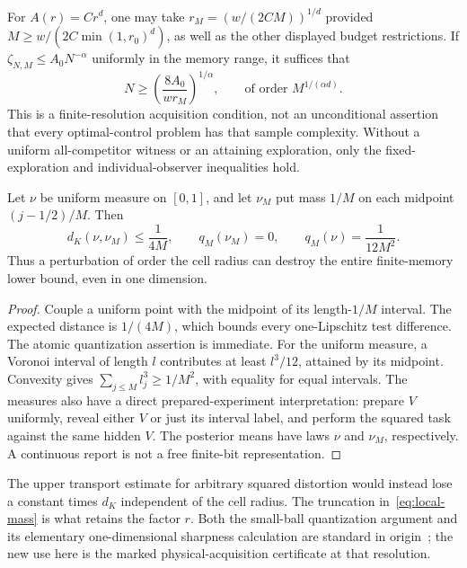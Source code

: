 For $A(r)=Cr^d$, one may take $r_M=(w/(2CM))^{1/d}$ provided $M\ge w/(2C\min(1,r_0)^d)$, as well as the other displayed budget restrictions. If $\zeta_{N,M}\le A_0N^{-\alpha}$ uniformly in the memory range, it suffices that
\[
 N\ge \left(\frac{8A_0}{wr_M}\right)^{1/\alpha},
 \qquad\text{of order }M^{1/(\alpha d)}.
\]
This is a finite-resolution acquisition condition, not an unconditional assertion that every optimal-control problem has that sample complexity. Without a uniform all-competitor witness or an attaining exploration, only the fixed-exploration and individual-observer inequalities hold.

\begin{proposition}\label{prop:resolution-sharp}
Let $\nu$ be uniform measure on $[0,1]$, and let $\nu_M$ put mass $1/M$ on each midpoint $(j-1/2)/M$. Then
\[
 d_K(\nu,\nu_M)\le\frac1{4M},\qquad
 q_M(\nu_M)=0,\qquad q_M(\nu)=\frac1{12M^2}.
\]
Thus a perturbation of order the cell radius can destroy the entire finite-memory lower bound, even in one dimension.
\end{proposition}
\begin{proof}
Couple a uniform point with the midpoint of its length-$1/M$ interval. The expected distance is $1/(4M)$, which bounds every one-Lipschitz test difference. The atomic quantization assertion is immediate. For the uniform measure, a Voronoi interval of length $l$ contributes at least $l^3/12$, attained by its midpoint. Convexity gives $\sum_{j\le M}l_j^3\ge1/M^2$, with equality for equal intervals. The measures also have a direct prepared-experiment interpretation: prepare $V$ uniformly, reveal either $V$ or just its interval label, and perform the squared task against the same hidden $V$. The posterior means have laws $\nu$ and $\nu_M$, respectively. A continuous report is not a free finite-bit representation.
\end{proof}
The upper transport estimate for arbitrary squared distortion would instead lose a constant times $d_K$ independent of the cell radius. The truncation in~\eqref{eq:local-mass} is what retains the factor $r$. Both the small-ball quantization argument and its elementary one-dimensional sharpness calculation are standard in origin~\cite{GrafLuschgy}; the new use here is the marked physical-acquisition certificate at that resolution.
